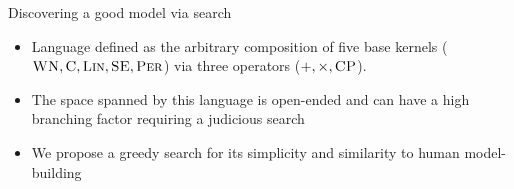 \begin{frame}{Discovering a good model via search}
  \begin{itemize}
    \item Language defined as the arbitrary composition of five base kernels (${\textsc{WN}}, {\textsc{C}}, {\textsc{Lin}}, {\textsc{SE}}, {\textsc{Per}}$) via three operators ($+, \times, {\textsc{CP}}$). 
    \vspace{\baselineskip}
    \item The space spanned by this language is open-ended and can have a high branching factor requiring a judicious search
    \vspace{\baselineskip}
    \item We propose a greedy search for its simplicity and similarity to human model-building
  \end{itemize}
\end{frame}

